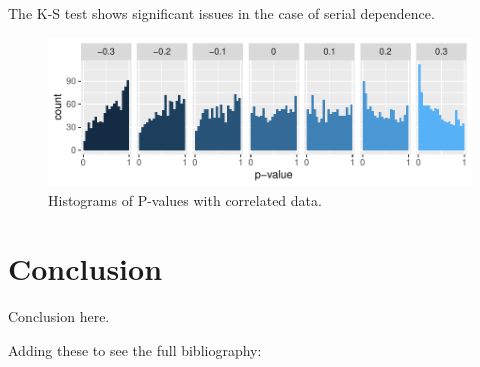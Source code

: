 \documentclass[12pt, letterpaper, titlepage]{article}
\begin{document}
The K-S test shows significant issues in the case of serial dependence.

\begin{figure}[!ht]
  \centering
  \includegraphics[width=0.8\linewidth]{hist_correlation}
  \caption{Histograms of P-values with correlated data.}
  \label{fig:hist_correlation}
\end{figure}

\hypertarget{sec:conclusion}{%
\section{Conclusion}\label{sec:conclusion}}

Conclusion here.

Adding these to see the full bibliography: 

\citet{Steinskog}
\citet{Weiss}
\citet{Massey}
\citet{Lilliefors}
\citet{dgof}
\citet{Conover}
\citet{Gleser}



\end{document}
